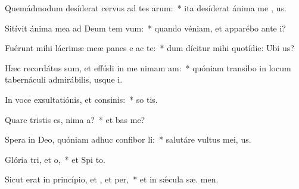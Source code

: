 \item Quemádmodum desíderat cervus ad tes arum:~* ita desíderat ánima me  , us.
\item Sitívit ánima mea ad Deum tem vum:~* quando véniam, et apparébo ante  i?
\item Fuérunt mihi lácrimæ meæ panes e ac te:~* dum dícitur mihi quotídie: Ubi   us?
\item Hæc recordátus sum, et effúdi in me nimam am:~* quóniam transíbo in locum tabernáculi admirábilis, usque   i.
\item In voce exsultatiónis, et consinis:~* so tis.
\item Quare tristis es, nima a?~* et  bas me?
\item Spera in Deo, quóniam adhuc confibor li:~* salutáre vultus mei,   us.
\item Glória tri, et o,~* et Spi to.
\item Sicut erat in princípio, et , et per,~* et in sǽcula sæ. men.
